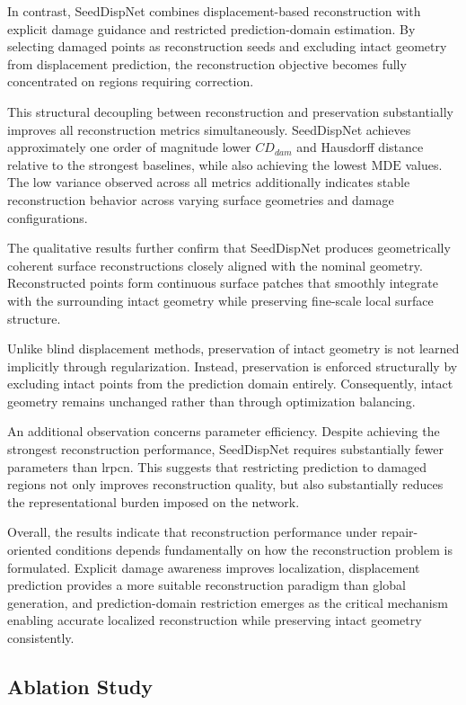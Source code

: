 In contrast, SeedDispNet combines displacement-based reconstruction with explicit damage guidance and restricted prediction-domain estimation. By selecting damaged points as reconstruction seeds and excluding intact geometry from displacement prediction, the reconstruction objective becomes fully concentrated on regions requiring correction.

This structural decoupling between reconstruction and preservation substantially improves all reconstruction metrics simultaneously. SeedDispNet achieves approximately one order of magnitude lower ${CD}_{dam}$ and Hausdorff distance relative to the strongest baselines, while also achieving the lowest $\mathrm{MDE}$ values. The low variance observed across all metrics additionally indicates stable reconstruction behavior across varying surface geometries and damage configurations.

The qualitative results further confirm that SeedDispNet produces geometrically coherent surface reconstructions closely aligned with the nominal geometry. Reconstructed points form continuous surface patches that smoothly integrate with the surrounding intact geometry while preserving fine-scale local surface structure.

Unlike blind displacement methods, preservation of intact geometry is not learned implicitly through regularization. Instead, preservation is enforced structurally by excluding intact points from the prediction domain entirely. Consequently, intact geometry remains unchanged rather than through optimization balancing.

An additional observation concerns parameter efficiency. Despite achieving the strongest reconstruction performance, SeedDispNet requires substantially fewer parameters than \ac{lrpcn}. This suggests that restricting prediction to damaged regions not only improves reconstruction quality, but also substantially reduces the representational burden imposed on the network.

Overall, the results indicate that reconstruction performance under repair-oriented conditions depends fundamentally on how the reconstruction problem is formulated. Explicit damage awareness improves localization, displacement prediction provides a more suitable reconstruction paradigm than global generation, and prediction-domain restriction emerges as the critical mechanism enabling accurate localized reconstruction while preserving intact geometry consistently.

\subsection{Ablation Study}
\label{sec:ablation_results}


